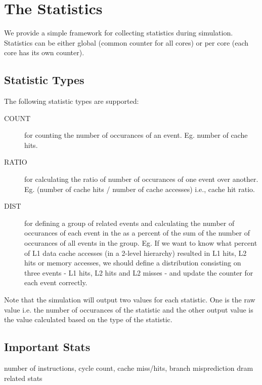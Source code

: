 \clearpage
\section{The Statistics}
\label{sec:stat}

We provide a simple framework for collecting statistics during simulation.
Statistics can be either global (common counter for all cores) or per core
(each core has its own counter).

\subsection{Statistic Types}

The following statistic types are supported:

\begin{description}

  \item [COUNT] for counting the number of occurances of an event. Eg. number
  of cache hits. 

  \item [RATIO] for calculating the ratio of number of occurances of one event
  over another. Eg. (number of cache hits / number of cache accesses) i.e.,
  cache hit ratio.

  \item [DIST]  for defining a group of related events and calculating the
  number of occurances of each event in the as a percent of the sum of the
  number of occurances of all events in the group.  Eg. If we want to know what
  percent of L1 data cache accesses (in a 2-level hierarchy) resulted in L1
  hits, L2 hits or memory accesses, we should define a distribution consisting
  on three events - L1 hits, L2 hits and L2 misses  - and update the
  counter for each event correctly. 

\end{description}


Note that the simulation will output two values for each statistic. One is the
raw value i.e. the number of occurances of the statistic and the other output
value is the value calculated based on the type of the statistic.

\subsection{Important Stats}

number of instructions, cycle count, cache miss/hits, 
       branch misprediction 
       dram related stats 

